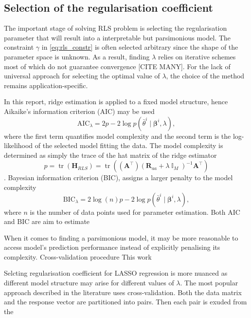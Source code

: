 \documentclass[a4paper,11pt,twoside]{article}
\DeclareMathOperator{\eye}{\mathbb{I}}
\DeclareMathOperator{\tr}{\textrm{tr}}
\theoremstyle{mytheoremstyle}
\begin{document}
\subsection{Selection of the regularisation coefficient}
\par The important stage of solving RLS problem is selecting the regularisation parameter that will result into a interpretable but parsimonious model. The constraint $\gamma$ in \eqref{eq:rls_constr} is often selected arbitrary since the shape of the parameter space is unknown. As a result, finding $\lambda$ relies on iterative schemes most of which do not guarantee convergence [CITE MANY]. For the lack of universal approach for selecting the optimal value of $\lambda$, the choice of the method remains application-specific.
\par In this report, ridge estimation is applied to a fixed model structure, hence Aikaike’s information criterion (AIC) may be used
\begin{equation}
\text{AIC}_{\lambda} = 2 p - 2\log p(\bar{\theta}^i \mid \mathbf{\beta}^i, \lambda),
\end{equation}
where the first term quantifies model complexity and the second term is the log-likelihood of the selected model fitting the data. The model complexity is determined as simply the trace of the hat matrix of the ridge estimator
\begin{equation}
p = \tr(\mathbf{H}_{RLS}) = \tr((\mathbf{A}^{\top})(\mathbf{R}_{aa} + \lambda \eye_M)^{-1} \mathbf{A}^{\top})
\end{equation}.
Bayesian information criterion (BIC), assigns a larger penalty to the model complexity 
\begin{equation}
\text{BIC}_{\lambda} = 2\log(n) p - 2\log p(\bar{\theta}^i \mid \mathbf{\beta}^i, \lambda),
\end{equation}
where $n$ is the number of data points used for parameter estimation. Both AIC and BIC are aim to estimate 

\par When it comes to finding a parsimonious model, it may be more reasonable to access model's prediction performance instead of explicitly penalising its complexity. Cross-validation procedure  
This work 
\par Selcting regularisation coefficient for LASSO regression is more nuanced as different model structure may arise for different values of $\lambda$. The most popular approach described in the literature uses cross-validation. Both the data matrix and the response vector are partitioned into pairs. Then each pair is exuded from the 
\end{document}
